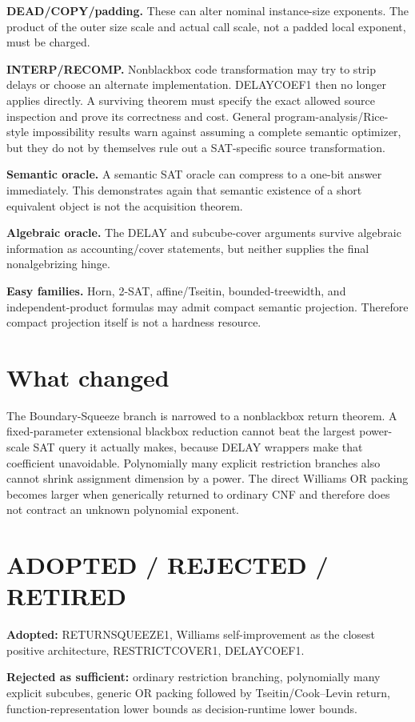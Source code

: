 \documentclass[11pt]{article}
\begin{document}
\textbf{DEAD/COPY/padding.} These can alter nominal instance-size exponents. The product of the outer size scale and actual call scale, not a padded local exponent, must be charged.

\textbf{INTERP/RECOMP.} Nonblackbox code transformation may try to strip delays or choose an alternate implementation. DELAYCOEF1 then no longer applies directly. A surviving theorem must specify the exact allowed source inspection and prove its correctness and cost. General program-analysis/Rice-style impossibility results warn against assuming a complete semantic optimizer, but they do not by themselves rule out a SAT-specific source transformation.

\textbf{Semantic oracle.} A semantic SAT oracle can compress to a one-bit answer immediately. This demonstrates again that semantic existence of a short equivalent object is not the acquisition theorem.

\textbf{Algebraic oracle.} The DELAY and subcube-cover arguments survive algebraic information as accounting/cover statements, but neither supplies the final nonalgebrizing hinge.

\textbf{Easy families.} Horn, 2-SAT, affine/Tseitin, bounded-treewidth, and independent-product formulas may admit compact semantic projection. Therefore compact projection itself is not a hardness resource.

\section*{What changed}
The Boundary-Squeeze branch is narrowed to a nonblackbox return theorem. A fixed-parameter extensional blackbox reduction cannot beat the largest power-scale SAT query it actually makes, because DELAY wrappers make that coefficient unavoidable. Polynomially many explicit restriction branches also cannot shrink assignment dimension by a power. The direct Williams OR packing becomes larger when generically returned to ordinary CNF and therefore does not contract an unknown polynomial exponent.

\section*{ADOPTED / REJECTED / RETIRED}
\textbf{Adopted:} RETURNSQUEEZE1, Williams self-improvement as the closest positive architecture, RESTRICTCOVER1, DELAYCOEF1.

\textbf{Rejected as sufficient:} ordinary restriction branching, polynomially many explicit subcubes, generic OR packing followed by Tseitin/Cook--Levin return, function-representation lower bounds as decision-runtime lower bounds.
\end{document}
